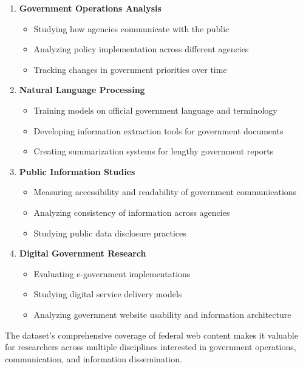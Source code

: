 \begin{enumerate}
    \item \textbf{Government Operations Analysis}
    \begin{itemize}
        \item Studying how agencies communicate with the public
        \item Analyzing policy implementation across different agencies
        \item Tracking changes in government priorities over time
    \end{itemize}
    
    \item \textbf{Natural Language Processing}
    \begin{itemize}
        \item Training models on official government language and terminology
        \item Developing information extraction tools for government documents
        \item Creating summarization systems for lengthy government reports
    \end{itemize}
    
    \item \textbf{Public Information Studies}
    \begin{itemize}
        \item Measuring accessibility and readability of government communications
        \item Analyzing consistency of information across agencies
        \item Studying public data disclosure practices
    \end{itemize}
    
    \item \textbf{Digital Government Research}
    \begin{itemize}
        \item Evaluating e-government implementations
        \item Studying digital service delivery models
        \item Analyzing government website usability and information architecture
    \end{itemize}
\end{enumerate}

The dataset's comprehensive coverage of federal web content makes it valuable for researchers across multiple disciplines interested in government operations, communication, and information dissemination.